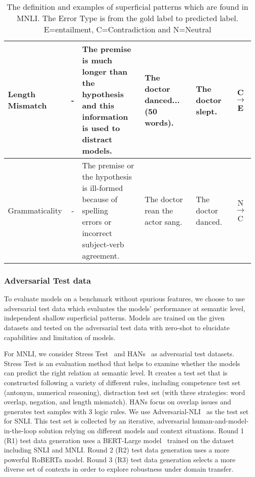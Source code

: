 \begin{table}[]
{\begin{tabular}{|l|c|l|l|l|c|}
Length Mismatch          & -                                    & \tabincell{l}{The premise is much longer than \\the hypothesis and this information \\is used to distract models. }            & The doctor danced...(50 words).     & The doctor slept.                      & C$\rightarrow$E        \\ \hline
Grammaticality           & -                                    & \tabincell{l}{The premise or the hypothesis \\is ill-formed because of spelling \\errors or incorrect subject-verb \\agreement.} & The doctor rean the actor sang.     & The doctor danced.                     & N$\rightarrow$C        \\ \hline
\end{tabular}}
	\caption{The definition and examples of superficial patterns which are found in MNLI. 
	The Error Type is from the gold label to predicted label. E=entailment, C=Contradiction and N=Neutral}
	\label{tab:cues}
\end{table}

\subsubsection{Adversarial Test data}
To evaluate models on a benchmark without spurious features, 
we choose to use adversarial test data which
 evaluates the models' performance at semantic level, independent shallow superficial patterns. 
Models are trained on the given datasets and tested on 
the adversarial test data with zero-shot to
 elucidate capabilities and limitation of models.
 
For MNLI, we consider Stress Test~\cite{naik2018stress} 
and HANs~\cite{mccoy2019right} as adversarial 
test datasets. Stress Test is an evaluation method that helps to examine whether the
models can predict the right relation at semantic level. 
It creates a test
set that is constructed following a variety of different rules,
including competence test set (antonym, numerical reasoning),
distraction test set (with three strategies: word overlap,
negation, and length mismatch). 
HANs focus on overlap issues and 
generates test samples with 3 logic rules. 
We use Adversarial-NLI~\cite{nie2019adversarial} as the test set for SNLI. 
This test set is collected by an iterative, adversarial human-and-model-in-the-loop 
solution relying on different models and context situations. 
Round 1 (R1) test data generation uses a BERT-Large model~\cite{devlin2018bert} 
trained on the dataset including SNLI and MNLI.
Round 2 (R2) test data generation uses a more powerful RoBERTa model. 
Round 3 (R3) test data generation selects a more diverse set of contexts
in order to explore robustness under domain transfer. 

